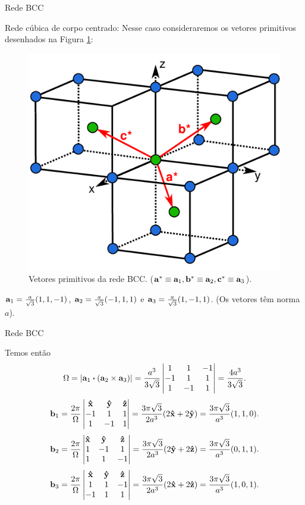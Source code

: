 \documentclass[aspectratio=169]{beamer}
\begin{document}
\begin{frame}{Rede BCC}

Rede cúbica de corpo centrado: Nesse caso consideraremos os vetores primitivos desenhados na Figura \ref{fig:bcc}:
\begin{figure}[H]
\centering
\includegraphics[width=0.35\linewidth]{fig/bcc.png}
\caption{Vetores primitivos da rede BCC. ($\vb{a}^{*} \equiv \vb{a}_1, \vb{b}^{*} \equiv \vb{a}_2, \vb{c}^{*} \equiv \vb{a}_3$).}
\label{fig:bcc}
\end{figure}

$\vb{a}_1 = \frac{a}{\sqrt{3}}(1, 1, -1)$, $\vb{a}_2 = \frac{a}{\sqrt{3}}(-1, 1, 1)$ e $\vb{a}_3 = \frac{a}{\sqrt{3}}(1, -1, 1)$. (Os vetores têm norma $a$).

\end{frame}




\begin{frame}{Rede BCC}

Temos então
$$
\Omega = \abs{\a_1 \vdot (\a_2 \times \a_3)} =
\frac{a^3}{3\sqrt{3}}
\begin{vmatrix}
1 & 1 & -1 \\
-1 & 1 & 1 \\
1 & -1 & 1 \\
\end{vmatrix}
=
\frac{4a^3}{3\sqrt{3}}.
$$
$$
\vb{b}_1 = \frac{2\pi}{\Omega}
\begin{vmatrix}
\vu{x} & \vu{y} & \vu{z} \\
-1 & 1 & 1 \\
1 & -1 & 1 \\
\end{vmatrix}
=
\frac{3\pi\sqrt{3}}{2a^3} (2\vu{x} + 2\vu{y}) = \frac{3\pi\sqrt{3}}{a^3} (1, 1, 0).
$$
$$
\vb{b}_2 = \frac{2\pi}{\Omega}
\begin{vmatrix}
\vu{x} & \vu{y} & \vu{z} \\
1 & -1 & 1 \\
1 & 1 & -1 \\
\end{vmatrix}
=
\frac{3\pi\sqrt{3}}{2a^3} (2\vu{y} + 2\vu{z}) = \frac{3\pi\sqrt{3}}{a^3} (0, 1, 1).
$$
$$
\vb{b}_3 = \frac{2\pi}{\Omega}
\begin{vmatrix}
\vu{x} & \vu{y} & \vu{z} \\
1 & 1 & -1 \\
-1 & 1 & 1 \\
\end{vmatrix}
=
\frac{3\pi\sqrt{3}}{2a^3} (2\vu{x} + 2\vu{z}) = \frac{3\pi\sqrt{3}}{a^3} (1, 0, 1).
$$

\end{frame}
\end{document}
